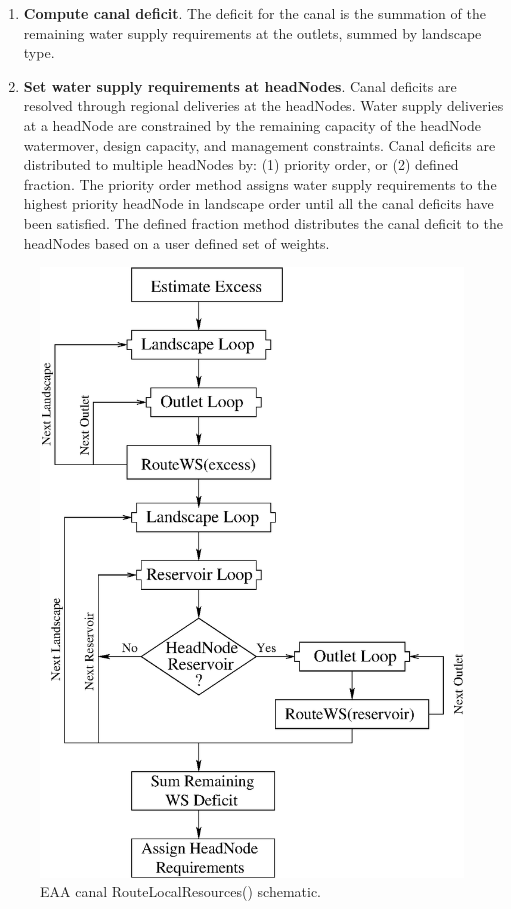 \begin{enumerate}
  \item {\bf Compute canal deficit}.  The deficit for the canal is the
  summation of the remaining water supply requirements at the outlets,
  summed by landscape type.

  \item {\bf Set water supply requirements at headNodes}.  Canal
  deficits are resolved through regional deliveries at the headNodes.
  Water supply deliveries at a headNode are constrained by the
  remaining capacity of the headNode watermover, design capacity, and
  management constraints.  Canal deficits are distributed to multiple
  headNodes by: (1) priority order, or (2) defined fraction.  The
  priority order method assigns water supply requirements to the
  highest priority headNode in landscape order until all the canal
  deficits have been satisfied.  The defined fraction method
  distributes the canal deficit to the headNodes based on a user
  defined set of weights.
  
\end{enumerate}

\begin{figure}[!htb]
 \begin{center}
  \includegraphics[scale=.5]{Graphics/eaaCanalWSRouteLocal}
  \caption{\label{fig:eaaCanalWSRouteLocal} EAA canal RouteLocalResources() schematic.}
 \end{center}
\end{figure}

